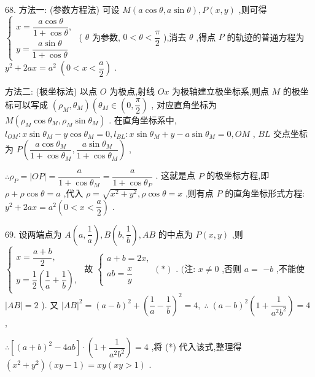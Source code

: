 68. 方法一: (参数方程法) 可设 $M\left( {a\cos \theta ,a\sin \theta }\right) ,P\left( {x,y}\right)$ ,则可得 $\left\{  \begin{array}{l} x = \dfrac{a\cos \theta }{1 + \cos \theta }, \\  y = \dfrac{a\sin \theta }{1 + \cos \theta } \end{array}\right.$ ( $\theta$ 为参数, $0 < \theta  < \dfrac{\pi }{2}$ ),消去 $\theta$ ,得点 $P$ 的轨迹的普通方程为 ${y}^{2} + {2ax} = {a}^{2}\;\left( {0 < x < \dfrac{a}{2}}\right)$ .

方法二: (极坐标法) 以点 $O$ 为极点,射线 ${Ox}$ 为极轴建立极坐标系,则点 $M$ 的极坐标可以写成 $\left( {{\rho }_{M},{\theta }_{M}}\right) \left( {{\theta }_{M} \in  \left( {0,\dfrac{\pi }{2}}\right) }\right.$ , 对应直角坐标为 $M\left( {{\rho }_{M}\cos {\theta }_{M},{\rho }_{M}\sin {\theta }_{M}}\right)$ . 在直角坐标系中, ${l}_{OM} : x\sin {\theta }_{M} - y\cos {\theta }_{M} = 0,{l}_{BL} : x\sin {\theta }_{M} + y - a\sin {\theta }_{M} = 0,{OM}$ , ${BL}$ 交点坐标为 $P\left( {\dfrac{a\cos {\theta }_{M}}{1 + \cos {\theta }_{M}},\dfrac{a\sin {\theta }_{M}}{1 + \cos {\theta }_{M}}}\right)$ ,

$\therefore {\rho }_{P} = \left| {OP}\right|  = \dfrac{a}{1 + \cos {\theta }_{M}} = \dfrac{a}{1 + \cos {\theta }_{P}}$ . 这就是点 $P$ 的极坐标方程,即 $\rho  + \rho \cos \theta  = a$ ,代入 $\rho  = \sqrt{{x}^{2} + {y}^{2}},\rho \cos \theta  = x$ ,则有点 $P$ 的直角坐标形式方程: ${y}^{2} + {2ax} = {a}^{2}\left( {0 < x < \dfrac{a}{2}}\right)$ .

69. 设两端点为 $A\left( {a,\dfrac{1}{a}}\right) ,B\left( {b,\dfrac{1}{b}}\right) ,{AB}$ 的中点为 $P\left( {x,y}\right)$ ,则 $\left\{  {\begin{array}{l} x = \dfrac{a + b}{2}, \\  y = \dfrac{1}{2}\left( {\dfrac{1}{a} + \dfrac{1}{b}}\right) , \end{array}\text{ 故 }\left\{  {\begin{array}{l} a + b = {2x}, \\  {ab} = \dfrac{x}{y} \end{array}\left( *\right) \text{ . (注: }x \neq  0}\right. }\right.$ ,否则 $a =$  $- b$ ,不能使 $\left| {AB}\right|  = 2$ ). 又 ${\left| AB\right| }^{2} = {\left( a - b\right) }^{2} + {\left( \dfrac{1}{a} - \dfrac{1}{b}\right) }^{2} = 4,\;\therefore \;{\left( a - b\right) }^{2}\left( {1 + \dfrac{1}{{a}^{2}{b}^{2}}}\right)  = 4$ ,

$\therefore \left\lbrack  {{\left( a + b\right) }^{2} - {4ab}}\right\rbrack   \cdot  \left( {1 + \dfrac{1}{{a}^{2}{b}^{2}}}\right)  = 4$ ,将 (*) 代入该式,整理得 $\left( {{x}^{2} + {y}^{2}}\right) \left( {{xy} - 1}\right)  = {xy}\left( {{xy} > 1}\right)$ .

